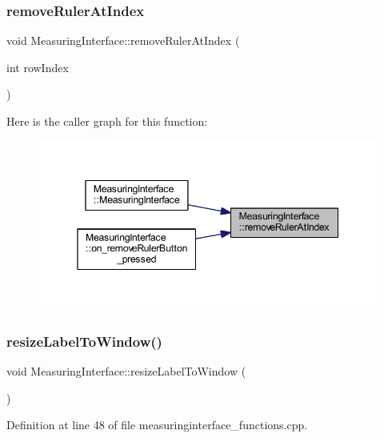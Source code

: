 \subsubsection{\texorpdfstring{removeRulerAtIndex}{removeRulerAtIndex}}
{\footnotesize\ttfamily void Measuring\+Interface\+::remove\+Ruler\+At\+Index (\begin{DoxyParamCaption}\item[{int}]{row\+Index }\end{DoxyParamCaption})\hspace{0.3cm}{\ttfamily [signal]}}

Here is the caller graph for this function\+:
\nopagebreak
\begin{figure}[H]
\begin{center}
\leavevmode
\includegraphics[width=345pt]{class_measuring_interface_afe9e0efd285c9239d38d2fa9b9d8ff43_icgraph}
\end{center}
\end{figure}
\mbox{\label{class_measuring_interface_a167a8fe58e371ea039490e90aa07c87d}} 
\subsubsection{\texorpdfstring{resizeLabelToWindow()}{resizeLabelToWindow()}}
{\footnotesize\ttfamily void Measuring\+Interface\+::resize\+Label\+To\+Window (\begin{DoxyParamCaption}{ }\end{DoxyParamCaption})\hspace{0.3cm}{\ttfamily [private]}}



Definition at line 48 of file measuringinterface\+\_\+functions.\+cpp.

